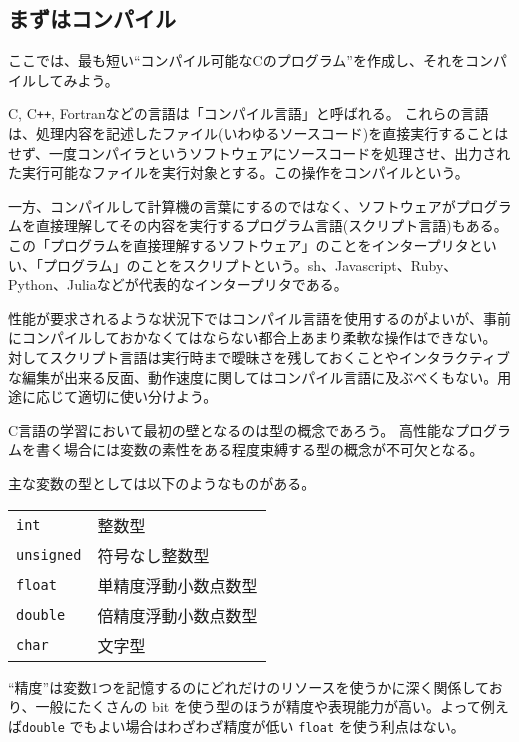\subsection{まずはコンパイル}

ここでは、最も短い``コンパイル可能なCのプログラム''を作成し、それをコンパイルしてみよう。

C, C\texttt{++}, Fortranなどの言語は「コンパイル言語」と呼ばれる。
これらの言語は、処理内容を記述したファイル(いわゆるソースコード)を直接実行することはせず、一度コンパイラというソフトウェアにソースコードを処理させ、出力された実行可能なファイルを実行対象とする。この操作をコンパイルという。

一方、コンパイルして計算機の言葉にするのではなく、ソフトウェアがプログラムを直接理解してその内容を実行するプログラム言語(スクリプト言語)もある。この「プログラムを直接理解するソフトウェア」のことをインタープリタといい、「プログラム」のことをスクリプトという。sh、Javascript、Ruby、Python、Juliaなどが代表的なインタープリタである。

性能が要求されるような状況下ではコンパイル言語を使用するのがよいが、事前にコンパイルしておかなくてはならない都合上あまり柔軟な操作はできない。
対してスクリプト言語は実行時まで曖昧さを残しておくことやインタラクティブな編集が出来る反面、動作速度に関してはコンパイル言語に及ぶべくもない。用途に応じて適切に使い分けよう。

C言語の学習において最初の壁となるのは型の概念であろう。
高性能なプログラムを書く場合には変数の素性をある程度束縛する型の概念が不可欠となる。

主な変数の型としては以下のようなものがある。
\begin{table}[H]
    \centering
    \begin{tabular}{ll}
        \texttt{int}      & 整数型               \\
        \texttt{unsigned} & 符号なし整数型       \\
        \texttt{float}    & 単精度浮動小数点数型 \\
        \texttt{double}   & 倍精度浮動小数点数型 \\
        \texttt{char}     & 文字型
    \end{tabular}
\end{table} \noindent
``精度''は変数1つを記憶するのにどれだけのリソースを使うかに深く関係しており、一般にたくさんの bit を使う型のほうが精度や表現能力が高い。よって例えば\texttt{double} でもよい場合はわざわざ精度が低い \texttt{float} を使う利点はない。

